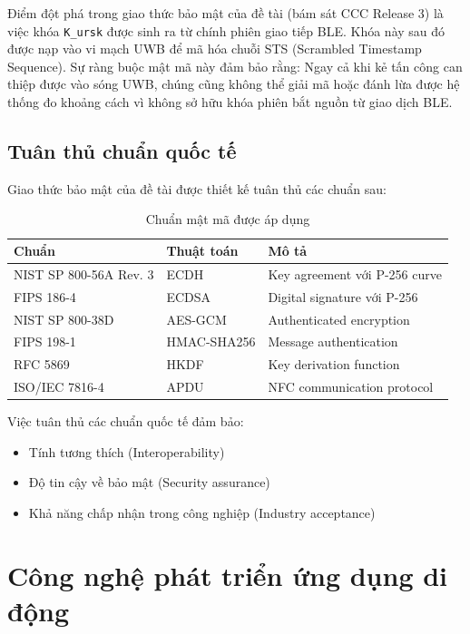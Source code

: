 Điểm đột phá trong giao thức bảo mật của đề tài (bám sát CCC Release 3) là việc khóa \texttt{K\_ursk} được sinh ra từ chính phiên giao tiếp BLE. Khóa này sau đó được nạp vào vi mạch UWB để mã hóa chuỗi STS (Scrambled Timestamp Sequence). Sự ràng buộc mật mã này đảm bảo rằng: Ngay cả khi kẻ tấn công can thiệp được vào sóng UWB, chúng cũng không thể giải mã hoặc đánh lừa được hệ thống đo khoảng cách vì không sở hữu khóa phiên bắt nguồn từ giao dịch BLE.

\subsection{Tuân thủ chuẩn quốc tế}

Giao thức bảo mật của đề tài được thiết kế tuân thủ các chuẩn sau:

\begin{table}[h]
\centering
\label{tab:crypto_standards}
\begin{tabular}{|l|l|p{6cm}|}
\hline
\textbf{Chuẩn} & \textbf{Thuật toán} & \textbf{Mô tả} \\
\hline
NIST SP 800-56A Rev. 3 & ECDH & Key agreement với P-256 curve \\
\hline
FIPS 186-4 & ECDSA & Digital signature với P-256 \\
\hline
NIST SP 800-38D & AES-GCM & Authenticated encryption \\
\hline
FIPS 198-1 & HMAC-SHA256 & Message authentication \\
\hline
RFC 5869 & HKDF & Key derivation function \\
\hline
ISO/IEC 7816-4 & APDU & NFC communication protocol \\
\hline
\end{tabular}
\caption{Chuẩn mật mã được áp dụng}
\end{table}

Việc tuân thủ các chuẩn quốc tế đảm bảo:
\begin{itemize}
    \item Tính tương thích (Interoperability)
    \item Độ tin cậy về bảo mật (Security assurance)
    \item Khả năng chấp nhận trong công nghiệp (Industry acceptance)
\end{itemize}


\section{Công nghệ phát triển ứng dụng di động}

